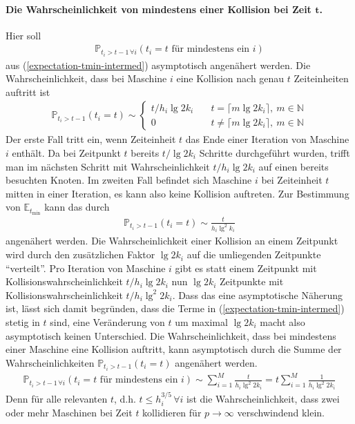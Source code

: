 \documentclass[a4paper, 10pt, ngerman]{article}
\newcommand{\E}{\mathbb{E}}
\newcommand{\N}{\mathbb{N}}
\renewcommand{\P}{\mathbb{P}}
\begin{document}
\paragraph{Die Wahrscheinlichkeit von mindestens einer Kollision bei Zeit $\pmb{t}$.} Hier soll
\begin{align*}
    \P_{t_i > t - 1 \, \forall i}(t_i = t \text{ für mindestens ein } i)
\end{align*}
aus (\ref{expectation-tmin-intermed}) asymptotisch angenähert werden. Die Wahrscheinlichkeit, dass bei Maschine $i$ eine Kollision nach genau $t$ Zeiteinheiten auftritt ist
\begin{align*}
    \P_{t_i > t - 1}(t_i = t) \sim
    \begin{cases}
        t / h_i \lg 2k_i & \quad t = \lceil m \lg 2k_i \rceil, \ m \in \N   \\
        0                & \quad t \ne \lceil m \lg 2k_i \rceil, \ m \in \N
    \end{cases}
\end{align*}
Der erste Fall tritt ein, wenn Zeiteinheit $t$ das Ende einer Iteration von Maschine $i$ enthält. Da bei Zeitpunkt $t$ bereits $t/\lg 2k_i$ Schritte durchgeführt wurden, trifft man im nächsten Schritt mit Wahrscheinlichkeit $t/h_i \lg 2k_i$ auf einen bereits besuchten Knoten. Im zweiten Fall befindet sich Maschine $i$ bei Zeiteinheit $t$ mitten in einer Iteration, es kann also keine Kollision auftreten. Zur Bestimmung von $\E_{t_{\min}}$ kann das durch
\begin{align*}
    \P_{t_i > t - 1}(t_i = t) \sim \frac {t} {h_i \lg^2 k_i}
\end{align*}
angenähert werden. Die Wahrscheinlichkeit einer Kollision an einem Zeitpunkt wird durch den zusätzlichen Faktor $\lg 2k_i$ auf die umliegenden Zeitpunkte "`verteilt"'. Pro Iteration von Maschine $i$ gibt es statt einem Zeitpunkt mit Kollisionswahrscheinlichkeit $t/h_i \lg 2k_i$ nun $\lg 2k_i$ Zeitpunkte mit Kollisionswahrscheinlichkeit $t/h_i \lg^2 2k_i$. Dass das eine asymptotische Näherung ist, lässt sich damit begründen, dass die Terme in (\ref{expectation-tmin-intermed}) stetig in $t$ sind, eine Veränderung von $t$ um maximal $\lg 2k_i$ macht also asymptotisch keinen Unterschied. Die Wahrscheinlichkeit, dass bei mindestens einer Maschine eine Kollision auftritt, kann asymptotisch durch die Summe der Wahrscheinlichkeiten $\P_{t_i > t - 1}(t_i = t)$ angenähert werden.
\begin{align}
    \P_{t_i > t - 1 \, \forall i}(t_i = t \text{ für mindestens ein } i) \sim \sum_{i = 1}^M \frac t {h_i \lg^2 2k_i} = t \sum_{i = 1}^M \frac 1 {h_i \lg^2 2k_i} \label{prob-at-least-one-coll}
\end{align}
Denn für alle relevanten $t$, d.h. $t \le h_i^{3/5} \, \forall i$ ist die Wahrscheinlichkeit, dass zwei oder mehr Maschinen bei Zeit $t$ kollidieren für $p \to \infty$ verschwindend klein.
\end{document}
